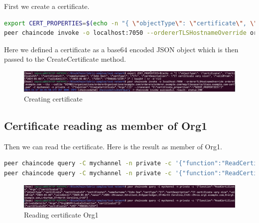 \documentclass[12pt]{article}
\begin{document}
First we create a certificate.

\begin{lstlisting}[language=bash]
export CERT_PROPERTIES=$(echo -n "{ \"objectType\": \"certificate\", \"certificateId\": \"certificate1\", \"nameSurname\": \"John Doe\", \"certType\": \"IT\", \"certDescription\": \"IT certificate very nice\", \"validFrom\": \"2024-01-01\", \"validUntil\": \"2025-01-01\", \"UID\": \"990101/1234\" }" | base64 | tr -d \\n)
peer chaincode invoke -o localhost:7050 --ordererTLSHostnameOverride orderer.example.com --tls --cafile "${PWD}/organizations/ordererOrganizations/example.com/orderers/orderer.example.com/msp/tlscacerts/tlsca.example.com-cert.pem" -C mychannel -n private -c '{"function":"CreateCertificate","Args":[]}' --transient "{\"certificate_properties\":\"$CERT_PROPERTIES\"}"
\end{lstlisting}

Here we defined a certificate as a base64 encoded JSON object which is then passed to the CreateCertificate method.

\begin{figure}[H]
    \centering
    \includegraphics[width=\textwidth]{imgs/creating_certificate.PNG}
    \caption{Creating certificate}
    \label{fig:creatingcertificate}
\end{figure}

\subsection{Certificate reading as member of Org1}

Then we can read the certificate. Here is the result as member of Org1.

\begin{lstlisting}[language=bash]
peer chaincode query -C mychannel -n private -c '{"function":"ReadCertificate","Args":["certificate1"]}'
peer chaincode query -C mychannel -n private -c '{"function":"ReadCertificatePrivateDetails","Args":["Org1MSPPrivateCollection","certificate1"]}'
\end{lstlisting}

\begin{figure}[H]
    \centering
    \includegraphics[width=\textwidth]{imgs/reading_certificate_org1.PNG}
    \caption{Reading certificate Org1}
    \label{fig:readingcertificate}
\end{figure}
\end{document}
